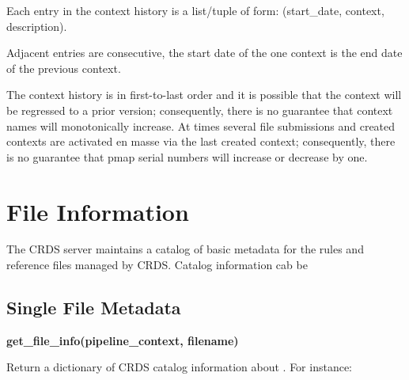 \documentclass[letterpaper,10pt,english]{sphinxmanual}
\begin{document}
Each entry in the context history is a list/tuple of form:  (start\_date, context, description).

Adjacent entries are consecutive,  the start date of the one context is the end date of the previous context.

The context history is in first-to-last order and it is possible that the context will be regressed to a prior
version;  consequently,  there is no guarantee that context names will monotonically increase.  At times several
file submissions and created contexts are activated en masse via the last created context;  consequently,  there
is no guarantee that pmap serial numbers will increase or decrease by one.


\section{File Information}
\label{web_services:file-information}
The CRDS server maintains a catalog of basic metadata for the rules and reference
files managed by CRDS.   Catalog information cab be


\subsection{Single File Metadata}
\label{web_services:single-file-metadata}
\textbf{get\_file\_info(pipeline\_context, filename)}

Return a dictionary of CRDS catalog information about .  For instance:
\end{document}
